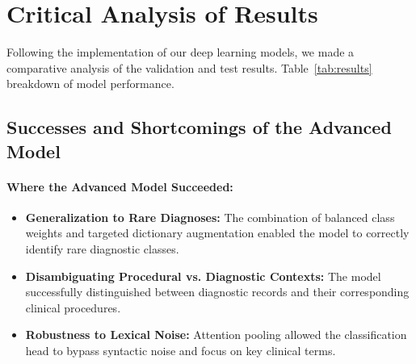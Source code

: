 \documentclass{article}
\begin{document}
\section{Critical Analysis of Results}
Following the  implementation of our deep learning models, we made a comparative analysis of the validation and test results. Table~\ref{tab:results} breakdown of model performance.

\begin{table}[h]
\centering
\caption{Model Performance Comparison on Clinical Codification (Stratified Split)}
\label{tab:results}
\end{table}


\subsection{Successes and Shortcomings of the Advanced Model}
\paragraph{Where the Advanced Model Succeeded:}
\begin{itemize}
    \item \textbf{Generalization to Rare Diagnoses:} The combination of balanced class weights and targeted dictionary augmentation enabled the model to correctly identify rare diagnostic classes. 
    \vspace{\baselineskip}

    \item \textbf{Disambiguating Procedural vs. Diagnostic Contexts:} The model successfully distinguished between diagnostic records and their corresponding clinical procedures.
    
    \item \textbf{Robustness to Lexical Noise:} Attention pooling allowed the classification head to bypass syntactic noise and focus on key clinical terms.
\end{itemize}
\end{document}
